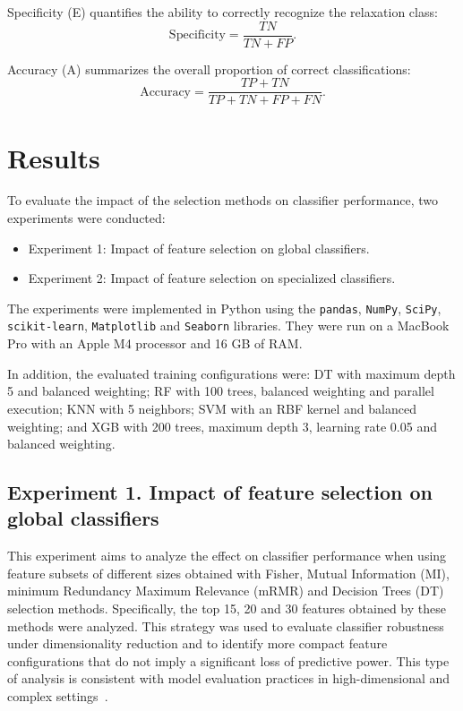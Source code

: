 \documentclass[lettersize,journal]{IEEEtran}
\begin{document}
Specificity (E) quantifies the ability to correctly recognize the relaxation class:
\begin{equation}
	\mathrm{Specificity}=\frac{TN}{TN+FP}.
\end{equation}

Accuracy (A) summarizes the overall proportion of correct classifications:
\begin{equation}
	\mathrm{Accuracy}=\frac{TP+TN}{TP+TN+FP+FN}.
\end{equation}

\section{Results}
To evaluate the impact of the selection methods on classifier performance, two experiments were conducted:

\begin{itemize}
	\item Experiment 1: Impact of feature selection on global classifiers.
	\item Experiment 2: Impact of feature selection on specialized classifiers.
\end{itemize}


The experiments were implemented in Python using the \texttt{pandas}, \texttt{NumPy}, \texttt{SciPy}, \texttt{scikit-learn}, \texttt{Matplotlib} and \texttt{Seaborn} libraries. They were run on a MacBook Pro with an Apple M4 processor and 16 GB of RAM.

In addition, the evaluated training configurations were: DT with maximum depth 5 and balanced weighting; RF with 100 trees, balanced weighting and parallel execution; KNN with 5 neighbors; SVM with an RBF kernel and balanced weighting; and XGB with 200 trees, maximum depth 3, learning rate 0.05 and balanced weighting.

\subsection{Experiment 1. Impact of feature selection on global classifiers}
This experiment aims to analyze the effect on classifier performance when using feature subsets of different sizes obtained with Fisher, Mutual Information (MI), minimum Redundancy Maximum Relevance (mRMR) and Decision Trees (DT) selection methods. Specifically, the top 15, 20 and 30 features obtained by these methods were analyzed. This strategy was used to evaluate classifier robustness under dimensionality reduction and to identify more compact feature configurations that do not imply a significant loss of predictive power. This type of analysis is consistent with model evaluation practices in high-dimensional and complex settings~\cite{Goodfellow2016}.
\end{document}

